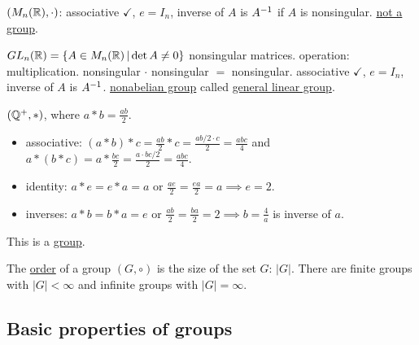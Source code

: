 \documentclass[]{article}
\begin{document}
\begin{example}
	$(M_n(\mathbb{R}),\cdot)$: associative $\checkmark$, $e= I_n$, inverse of $A$ is $A^{-1}$ if $A$ is nonsingular. \ul{not a group}.
\end{example}
\begin{example}
	$GL_n(\mathbb{R}) = \left\{ A\in M_n(\mathbb{R}) \, \middle| \, \det A \neq 0 \right\}$ nonsingular matrices. operation: multiplication. nonsingular $\cdot$ nonsingular $=$ nonsingular. associative $\checkmark$, $e = I_n$, inverse of $A$ is $A^{-1}$. \ul{nonabelian group} called \ul{general linear group}.
\end{example}
\begin{example}
	$(\mathbb{Q}^+,*)$, where $a*b = \frac{ab}{2}$.
	\begin{itemize}
		\item associative: $(a*b)*c = \frac{ab}{2} * c = \frac{ab/2\cdot c}{2} = \frac{abc}{4}$ and $a*(b*c) = a*\frac{bc}{2} = \frac{a\cdot bc/2}{2} = \frac{abc}{4}$.
		\item identity: $a*e = e*a = a$ or $\frac{ae}{2} = \frac{ea}{2} = a \implies e = 2$.
		\item inverses: $a*b = b*a = e$ or $\frac{ab}{2} = \frac{ba}{2} = 2 \implies b = \frac{4}{a}$ is inverse of $a$.
	\end{itemize}
	This is a \ul{group}.
\end{example}

\begin{definition}
	The \ul{order} of a group $(G,\circ)$ is the size of the set $G$: $|G|$. There are finite groups with $|G|<\infty$ and infinite groups with $|G|=\infty$.
\end{definition}

\subsection{Basic properties of groups}
\end{document}
